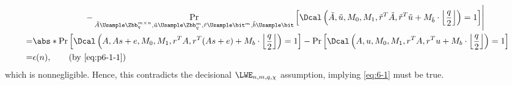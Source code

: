 \begin{answer}[i]
\begin{align*}
        &\qquad\qquad\qquad \left.-
        \Pr_{\tilde{A}\Usample\Zbb_q^{m\times n},\tilde{u}\Usample\Zbb_q^m, \tilde{r}\Usample\bit^m, \tilde{b}\Usample\bit}\left[\Dcal\left(\tilde{A}, \tilde{u}, M_0, M_1, \tilde{r}^T\tilde{A}, \tilde{r}^T \tilde{u}+M_{\tilde{b}} \cdot \left\lfloor\frac{q}{2}\right\rfloor\right)= 1\right]\right\rvert\\
        =& \abs*{\Pr\left[\Dcal\left(A, As+e, M_0, M_1, r^TA, r^T(As+e) + M_b \cdot \left\lfloor\frac{q}{2}\right\rfloor\right)=1\right]
        - 
        \Pr\left[\Dcal\left(A, u, M_0, M_1, r^TA, r^Tu + M_b \cdot \left\lfloor\frac{q}{2}\right\rfloor\right)=1\right]}\\
        =& \epsilon(n), \qquad (\textrm{by \eqref{eq:p6-1-1}})
    \end{align*}
    which is nonnegligible. Hence, this contradicts the decisional $\LWE_{n,m,q,\chi}$ assumption, implying \eqref{eq:6-1} must be true. 
\end{answer}











